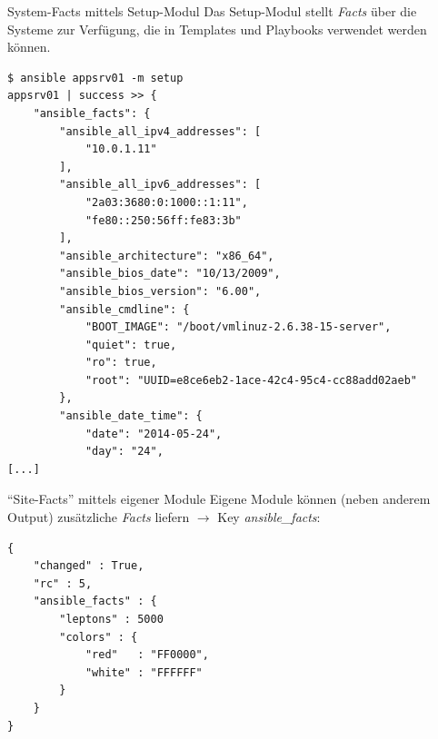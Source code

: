 \begin{frame}[fragile]{System-Facts mittels Setup-Modul}
  Das Setup-Modul stellt \emph{Facts} über die Systeme zur Verfügung,
  die in Templates und Playbooks verwendet werden können.
  \vspace{1ex}
  \begin{lstlisting}[basicstyle=\tiny\ttfamily]
$ ansible appsrv01 -m setup
appsrv01 | success >> {
    "ansible_facts": {
        "ansible_all_ipv4_addresses": [
            "10.0.1.11"
        ], 
        "ansible_all_ipv6_addresses": [
            "2a03:3680:0:1000::1:11", 
            "fe80::250:56ff:fe83:3b"
        ], 
        "ansible_architecture": "x86_64", 
        "ansible_bios_date": "10/13/2009", 
        "ansible_bios_version": "6.00", 
        "ansible_cmdline": {
            "BOOT_IMAGE": "/boot/vmlinuz-2.6.38-15-server", 
            "quiet": true,
            "ro": true,
            "root": "UUID=e8ce6eb2-1ace-42c4-95c4-cc88add02aeb"
        }, 
        "ansible_date_time": {
            "date": "2014-05-24", 
            "day": "24",
[...]
  \end{lstlisting}
\end{frame}

\begin{frame}[fragile]{"`Site-Facts"' mittels eigener Module}
  Eigene Module können (neben anderem Output) zusätzliche \emph{Facts}
  liefern $\to$ Key \emph{ansible\_facts}:
  \vspace{1ex}
  \begin{lstlisting}
{
    "changed" : True,
    "rc" : 5,
    "ansible_facts" : {
        "leptons" : 5000
        "colors" : {
            "red"   : "FF0000",
            "white" : "FFFFFF"
        }
    }
}
  \end{lstlisting}
\end{frame}


